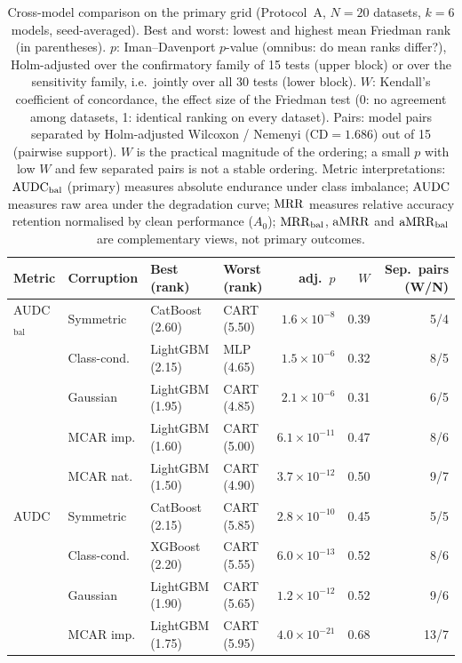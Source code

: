 \begin{table}[t]
\centering
\footnotesize
\caption{Cross-model comparison on the primary grid (Protocol~A, $N=20$ datasets, $k=6$ models, seed-averaged). Best and worst: lowest and highest mean Friedman rank (in parentheses). $p$: Iman--Davenport $p$-value (omnibus: do mean ranks differ?), Holm-adjusted over the confirmatory family of 15 tests (upper block) or over the sensitivity family, i.e.\ jointly over all 30 tests (lower block). $W$: Kendall's coefficient of concordance, the effect size of the Friedman test (0: no agreement among datasets, 1: identical ranking on every dataset). Pairs: model pairs separated by Holm-adjusted Wilcoxon / Nemenyi (CD$=1.686$) out of 15 (pairwise support). $W$ is the practical magnitude of the ordering; a small $p$ with low $W$ and few separated pairs is not a stable ordering. Metric interpretations: $\mathrm{AUDC}_{\mathrm{bal}}$ (primary) measures absolute endurance under class imbalance; $\mathrm{AUDC}$ measures raw area under the degradation curve; $\mathrm{MRR}$ measures relative accuracy retention normalised by clean performance ($A_0$); $\mathrm{MRR}_{\mathrm{bal}}$, $\mathrm{aMRR}$ and $\mathrm{aMRR}_{\mathrm{bal}}$ are complementary views, not primary outcomes.}
\label{tab:combined}
\setlength{\tabcolsep}{4pt}
\begin{tabular}{@{}llllrrr@{}}
\toprule
Metric & Corruption & Best (rank) & Worst (rank) & adj.\ $p$ & $W$ & Sep.\ pairs (W/N) \\
\midrule
AUDC$_{\mathrm{bal}}$ & Symmetric & CatBoost (2.60) & CART (5.50) & $1.6\times10^{-8}$ & 0.39 & 5/4 \\
 & Class-cond. & LightGBM (2.15) & MLP (4.65) & $1.5\times10^{-6}$ & 0.32 & 8/5 \\
 & Gaussian & LightGBM (1.95) & CART (4.85) & $2.1\times10^{-6}$ & 0.31 & 6/5 \\
 & MCAR imp. & LightGBM (1.60) & CART (5.00) & $6.1\times10^{-11}$ & 0.47 & 8/6 \\
 & MCAR nat. & LightGBM (1.50) & CART (4.90) & $3.7\times10^{-12}$ & 0.50 & 9/7 \\
AUDC & Symmetric & CatBoost (2.15) & CART (5.85) & $2.8\times10^{-10}$ & 0.45 & 5/5 \\
 & Class-cond. & XGBoost (2.20) & CART (5.55) & $6.0\times10^{-13}$ & 0.52 & 8/6 \\
 & Gaussian & LightGBM (1.90) & CART (5.65) & $1.2\times10^{-12}$ & 0.52 & 9/6 \\
 & MCAR imp. & LightGBM (1.75) & CART (5.95) & $4.0\times10^{-21}$ & 0.68 & 13/7 \\

\end{tabular}
\end{table}
